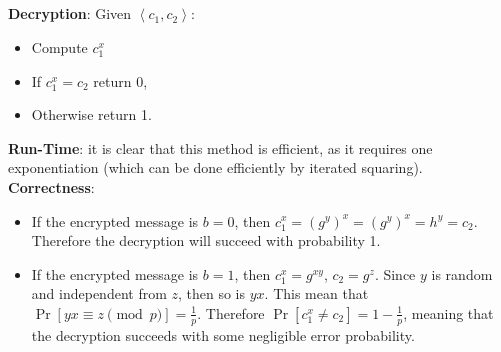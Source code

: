 \documentclass{article}
\begin{document}
\subsection{} %
\textbf{Decryption}: Given $ \left<c_1, c_2\right> $:
\begin{itemize}
\item Compute $ c_1^x $
\item If $ c_1^x = c_2 $ return 0,
\item Otherwise return 1.
\end{itemize}
\textbf{Run-Time}: it is clear that this method is efficient, as it requires one exponentiation (which can be done efficiently by iterated squaring). \\
\textbf{Correctness}:
\begin{itemize}
\item  If the encrypted message is $ b = 0 $, then $ c_1^x = \left(g^y\right)^x = \left(g^y\right)^x = h^y = c_2 $. Therefore the decryption will succeed with probability 1.
\item If the encrypted message is $ b = 1 $, then $ c_1^x = g^{xy} $, $ c_2 =g^z $. Since $ y $ is random and independent from $ z $, then so is $ yx $. This mean that $ \Pr[yx \equiv z \pmod{p}] = \frac{1}{p} $. Therefore $ \Pr[c_1^x \neq c_2] = 1 - \frac{1}{p} $, meaning that the decryption succeeds with some negligible error probability.
\end{itemize}
\end{document}
